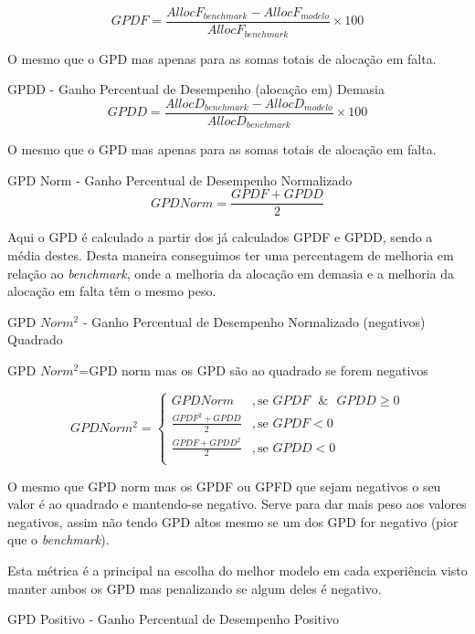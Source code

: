 \begin{equation} \label{eq:gpdf} 
    GPDF = \frac{AllocF_{benchmark} - AllocF_{modelo}}{AllocF_{benchmark}} \times 100
\end{equation}
\smallskip

O mesmo que o GPD mas apenas para as somas totais de alocação em falta.\par
\bigskip
GPDD - Ganho Percentual de Desempenho (alocação em) Demasia\\

\begin{equation} \label{eq:gpdd} 
    GPDD = \frac{AllocD_{benchmark} - AllocD_{modelo}}{AllocD_{benchmark}} \times 100
\end{equation}
\smallskip

O mesmo que o GPD mas apenas para as somas totais de alocação em falta.\par
\bigskip
GPD Norm - Ganho Percentual de Desempenho Normalizado \\

\begin{equation} \label{eq:gpdnorm} 
    GPD Norm = \frac{GPDF + GPDD}{2}
\end{equation}
\smallskip

Aqui o GPD é calculado a partir dos já calculados GPDF e GPDD, sendo a média destes. Desta maneira conseguimos ter uma percentagem de melhoria em relação ao \textit{benchmark}, onde a melhoria da alocação em demasia e a melhoria da alocação em falta têm o mesmo peso.\par

\bigskip
GPD $Norm^{2}$ - Ganho Percentual de Desempenho Normalizado (negativos) Quadrado

 GPD $Norm^{2}$=GPD norm mas os GPD são ao quadrado se forem negativos  


 \begin{equation} \label{eq:gpdnorm2} 
    GPD Norm^{2} = 
    \begin{cases} 
        GPD Norm & , \text{se } GPDF \text{ }\&\text{ } GPDD \geq 0 \\
        \frac{GPDF^{2} + GPDD}{2} & , \text{se } GPDF  < 0 \\
        \frac{GPDF + GPDD^{2}}{2} & , \text{se } GPDD < 0 \\
    \end{cases} 
\end{equation}
\smallskip


O mesmo que GPD norm mas os GPDF ou GPFD que sejam negativos o seu valor é ao quadrado e mantendo-se negativo. Serve para dar mais peso aos valores negativos, assim não tendo GPD altos mesmo se um dos GPD for negativo (pior que o \textit{benchmark}).\par
Esta métrica é a principal na escolha do melhor modelo em cada experiência visto manter ambos os GPD mas penalizando se algum deles é negativo.\par
\bigskip
GPD Positivo  - Ganho Percentual de Desempenho Positivo

